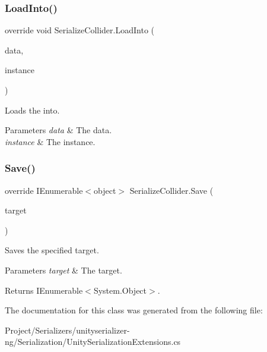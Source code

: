 \subsubsection{\texorpdfstring{Load\+Into()}{LoadInto()}}
{\footnotesize\ttfamily override void Serialize\+Collider.\+Load\+Into (\begin{DoxyParamCaption}\item[{object \mbox{[}$\,$\mbox{]}}]{data,  }\item[{Terrain\+Collider}]{instance }\end{DoxyParamCaption})\hspace{0.3cm}{\ttfamily [inline]}}



Loads the into. 


\begin{DoxyParams}{Parameters}
{\em data} & The data.\\
\hline
{\em instance} & The instance.\\
\hline
\end{DoxyParams}
\mbox{\label{class_serialize_collider_af8330f26c986a715cb6bad3a1e018d77}} 
\subsubsection{\texorpdfstring{Save()}{Save()}}
{\footnotesize\ttfamily override I\+Enumerable$<$object$>$ Serialize\+Collider.\+Save (\begin{DoxyParamCaption}\item[{Terrain\+Collider}]{target }\end{DoxyParamCaption})\hspace{0.3cm}{\ttfamily [inline]}}



Saves the specified target. 


\begin{DoxyParams}{Parameters}
{\em target} & The target.\\
\hline
\end{DoxyParams}
\begin{DoxyReturn}{Returns}
I\+Enumerable$<$System.\+Object$>$.
\end{DoxyReturn}


The documentation for this class was generated from the following file\+:\begin{DoxyCompactItemize}
\item 
Project/\+Serializers/unityserializer-\/ng/\+Serialization/Unity\+Serialization\+Extensions.\+cs\end{DoxyCompactItemize}
